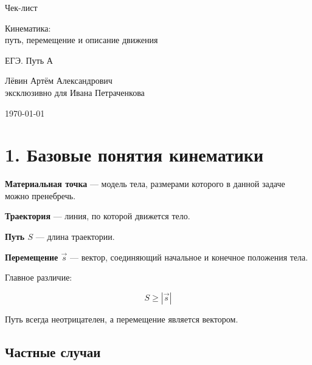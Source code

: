 \documentclass[a4paper,12pt]{article}
\begin{document}
\begin{titlepage}
\centering

{\Large\textcolor{darkaccent}{Чек-лист}\par}

\vspace{1cm}

{\huge Кинематика:\\
путь, перемещение и описание движения\par}

\vspace{1cm}

{\Large ЕГЭ. Путь А\par}

\vfill

{\large Лёвин Артём Александрович\\
эксклюзивно для Ивана Петраченкова\par}

\vspace{0.5cm}

{\large \today}

\vspace{1cm}


\end{titlepage}

\section*{1. Базовые понятия кинематики}

\textbf{Материальная точка} --- модель тела, размерами которого в данной задаче можно пренебречь.

\textbf{Траектория} --- линия, по которой движется тело.

\textbf{Путь $S$} --- длина траектории.

\textbf{Перемещение $\vec{s}$} --- вектор, соединяющий начальное и конечное положения тела.

Главное различие:

\[
S\geq |\vec{s}|
\]

Путь всегда неотрицателен, а перемещение является вектором.

\subsection*{Частные случаи}
\end{document}
